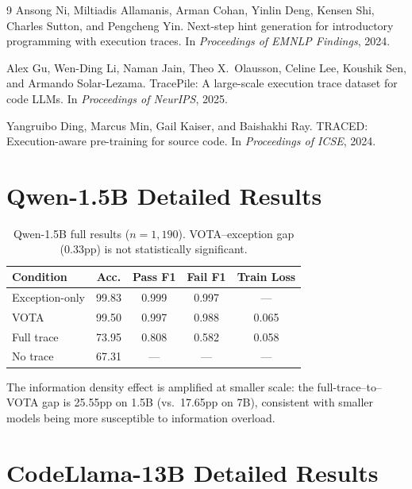 \documentclass[11pt,a4paper]{article}
\begin{document}

\begin{thebibliography}{9}
Ansong Ni, Miltiadis Allamanis, Arman Cohan, Yinlin Deng, Kensen Shi, Charles Sutton, and Pengcheng Yin.
\newblock Next-step hint generation for introductory programming with execution traces.
\newblock In \emph{Proceedings of EMNLP Findings}, 2024.

Alex Gu, Wen-Ding Li, Naman Jain, Theo X.~Olausson, Celine Lee, Koushik Sen, and Armando Solar-Lezama.
\newblock TracePile: A large-scale execution trace dataset for code LLMs.
\newblock In \emph{Proceedings of NeurIPS}, 2025.

Yangruibo Ding, Marcus Min, Gail Kaiser, and Baishakhi Ray.
\newblock TRACED: Execution-aware pre-training for source code.
\newblock In \emph{Proceedings of ICSE}, 2024.
\end{thebibliography}

\appendix
\section{Qwen-1.5B Detailed Results}

\begin{table}[h]
\centering
\small
\begin{tabular}{lcccc}
\toprule
\textbf{Condition} & \textbf{Acc.} & \textbf{Pass F1} & \textbf{Fail F1} & \textbf{Train Loss} \\
\midrule
Exception-only & 99.83 & 0.999 & 0.997 & --- \\
VOTA           & 99.50 & 0.997 & 0.988 & 0.065 \\
Full trace     & 73.95 & 0.808 & 0.582 & 0.058 \\
No trace       & 67.31 & --- & --- & --- \\
\bottomrule
\end{tabular}
\caption{Qwen-1.5B full results ($n = 1{,}190$). VOTA--exception gap (0.33pp) is not statistically significant.}
\label{tab:qwen15b-full}
\end{table}

The information density effect is amplified at smaller scale: the full-trace--to--VOTA gap is 25.55pp on 1.5B (vs.\ 17.65pp on 7B), consistent with smaller models being more susceptible to information overload.

\section{CodeLlama-13B Detailed Results}
\end{document}
